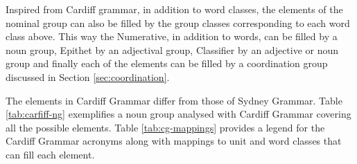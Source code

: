 Inspired from Cardiff grammar, in addition to word classes, the elements of the nominal group can also be filled by the group classes corresponding to each word class above. This way the Numerative, in addition to words, can be filled by a noun group, Epithet by an adjectival group, Classifier by an adjective or noun group and finally each of the elements can be filled by a coordination group discussed in Section \ref{sec:coordination}.


The elements in Cardiff Grammar differ from those of Sydney Grammar. Table \ref{tab:carfiff-ng} exemplifies a noun group analysed with Cardiff Grammar covering all the possible elements. Table \ref{tab:cg-mappings} provides a legend for the Cardiff Grammar acronyms along with mappings to unit and word classes that can fill each element.

